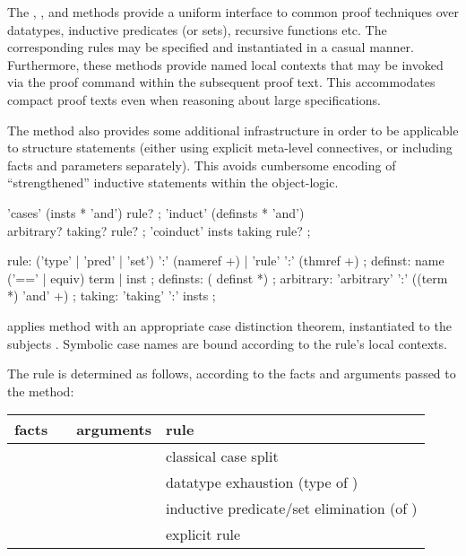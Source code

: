 \begin{isabellebody}
\begin{isamarkuptext}
  The \mbox{}, \mbox{}, and \mbox{}
  methods provide a uniform interface to common proof techniques over
  datatypes, inductive predicates (or sets), recursive functions etc.
  The corresponding rules may be specified and instantiated in a
  casual manner.  Furthermore, these methods provide named local
  contexts that may be invoked via the \mbox{} proof command
  within the subsequent proof text.  This accommodates compact proof
  texts even when reasoning about large specifications.

  The \mbox{} method also provides some additional
  infrastructure in order to be applicable to structure statements
  (either using explicit meta-level connectives, or including facts
  and parameters separately).  This avoids cumbersome encoding of
  ``strengthened'' inductive statements within the object-logic.

  \begin{rail}
    'cases' (insts * 'and') rule?
    ;
    'induct' (definsts * 'and') \\ arbitrary? taking? rule?
    ;
    'coinduct' insts taking rule?
    ;

    rule: ('type' | 'pred' | 'set') ':' (nameref +) | 'rule' ':' (thmref +)
    ;
    definst: name ('==' | equiv) term | inst
    ;
    definsts: ( definst *)
    ;
    arbitrary: 'arbitrary' ':' ((term *) 'and' +)
    ;
    taking: 'taking' ':' insts
    ;
  \end{rail}

  \begin{descr}

  \item [\mbox{\isa{cases}}~\isa{insts\ R}] applies method \mbox{} with an appropriate case distinction theorem, instantiated to
  the subjects .  Symbolic case names are bound according
  to the rule's local contexts.

  The rule is determined as follows, according to the facts and
  arguments passed to the \mbox{} method:

  \medskip
  \begin{tabular}{llll}
    facts           &                 & arguments   & rule \\\hline
                    & \mbox{\isa{cases}} &             & classical case split \\
                    & \mbox{\isa{cases}} & \isa{t}   & datatype exhaustion (type of \isa{t}) \\
    \isa{{\isasymturnstile}\ A\ t} & \mbox{\isa{cases}} & \isa{{\isasymdots}} & inductive predicate/set elimination (of \isa{A}) \\
    \isa{{\isasymdots}}     & \mbox{\isa{cases}} & \isa{{\isasymdots}\ rule{\isacharcolon}\ R} & explicit rule \isa{R} \\
  \end{tabular}
  \medskip


\end{descr}
\end{isamarkuptext}
\end{isabellebody}
